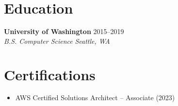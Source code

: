 \documentclass[10pt,letterpaper]{article}
\begin{document}
\section{Education}
\noindent\textbf{University of Washington} \hfill 2015--2019\\
\textit{B.S. Computer Science} \hfill \textit{Seattle, WA}

\section{Certifications}
\begin{itemize}
\item AWS Certified Solutions Architect -- Associate (2023)
\end{itemize}
\end{document}
